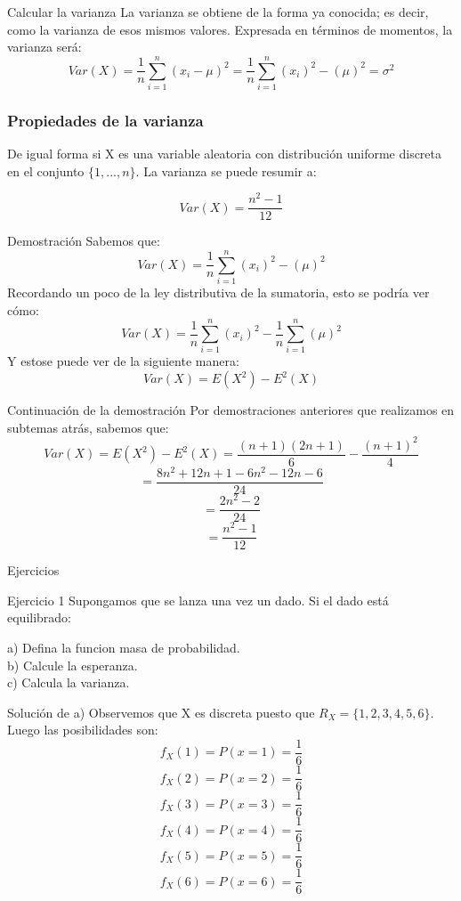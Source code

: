 \documentclass[11pt]{beamer}
\begin{document}
\begin{frame}{Calcular la varianza}
La varianza se obtiene de la forma ya conocida; es decir, como la varianza de esos mismos valores. Expresada en términos de momentos, la varianza será:
$$Var(X)=\dfrac{1}{n}\sum_{i=1}^{n}(x_{i}-\mu)^{2}= \dfrac{1}{n}\sum_{i=1}^{n}(x_{i})^2 - (\mu)^{2} =\sigma ^{2}$$
\end{frame} 

\begin{frame}\frametitle{Propiedades de la varianza}
De igual forma si X es una variable aleatoria  con distribución uniforme discreta en el conjunto $\lbrace 1,...,n \rbrace$. La varianza se puede resumir a:

$$Var(X) = \dfrac{n^{2} - 1}{12}$$

\end{frame}

\begin{frame}{Demostración}
Sabemos que:
$$Var(X)= \dfrac{1}{n}\sum_{i=1}^{n}(x_{i})^2 -(\mu)^{2}$$
Recordando un poco de la ley distributiva de la sumatoria, esto se podría ver cómo:
$$Var(X) =  \dfrac{1}{n}\sum_{i=1}^{n}(x_{i})^2 - \dfrac{1}{n}\sum_{i=1}^{n}(\mu)^{2}$$
Y estose puede ver de la siguiente manera:
$$Var(X) =E(X^2) - E^2(X)$$
\end{frame}

\begin{frame}{Continuación de la demostración}
Por demostraciones anteriores que realizamos en subtemas atrás, sabemos que:
$$Var(X) = E(X^2) - E^2(X)= \dfrac{(n + 1)(2n + 1)}{6} - \dfrac{(n +1)^2}{4}$$
$$=\dfrac{8n^2 + 12n + 1 - 6n^2 - 12n - 6}{24}$$
$$= \dfrac{2n^2 - 2}{24}$$
$$= \dfrac{n^2 - 1}{12}$$
\end{frame}

\begin{frame}{Ejercicios}
\begin{block}{Ejercicio 1}
Supongamos que se lanza una vez un dado. Si el dado está equilibrado:

a) Defina la funcion masa de probabilidad.\\
b) Calcule la esperanza.\\
c) Calcula la varianza.
\end{block}
\end{frame}

\begin{frame}{Solución de a)}
Observemos que X es discreta puesto que $R_{X}=\lbrace 1, 2, 3, 4, 5, 6 \rbrace$. Luego las posibilidades son:
$$f_{X}(1)=P(x=1)=\dfrac{1}{6}$$
$$f_{X}(2)=P(x=2)=\dfrac{1}{6}$$$$f_{X}(3)=P(x=3)=\dfrac{1}{6}$$
$$f_{X}(4)=P(x=4)=\dfrac{1}{6}$$
$$f_{X}(5)=P(x=5)=\dfrac{1}{6}$$
$$f_{X}(6)=P(x=6)=\dfrac{1}{6}$$
\end{frame}
\end{document}
